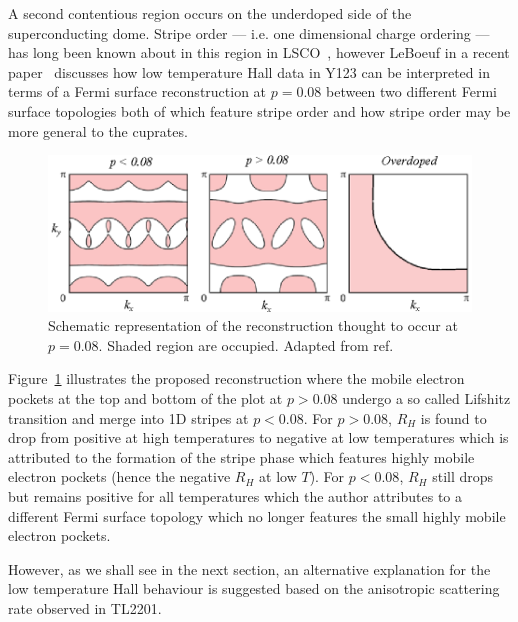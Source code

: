 A second contentious region occurs on the underdoped side of the superconducting dome. Stripe order --- i.e. one dimensional charge ordering --- has long been known about in this region in \ac{LSCO}~\cite{Kivelson2003}, however LeBoeuf \etal{} in a recent paper~\cite{LeBoeuf2011} discusses how low temperature Hall data in \ac{Y123} can be interpreted in terms of a Fermi surface reconstruction at $p=0.08$ between two different Fermi surface topologies both of which feature stripe order and how stripe order may be more general to the cuprates.
\begin{figure}[htbp]
    \begin{center}
        \includegraphics[scale=0.9]{Chapter-Introduction/Figures/LifshitzReconstruction/LifshitzReconstruction}
        \caption{Schematic representation of the reconstruction thought to occur at $p=0.08$. Shaded region are occupied. Adapted from ref.~\cite{Vojta2011}}
        \label{Fig:Intro:LifshitzReconstruction}
    \end{center}
\end{figure}
Figure~\ref{Fig:Intro:LifshitzReconstruction} illustrates the proposed reconstruction where the mobile electron pockets at the top and bottom of the plot at $p > 0.08$ undergo a so called Lifshitz transition and merge into 1D stripes at $p < 0.08$.  For $p > 0.08$, $R_H$ is found to drop from positive at high temperatures to negative at low temperatures which is attributed to the formation of the stripe phase which features highly mobile electron pockets (hence the negative $R_H$ at low $T$). For $p < 0.08$, $R_H$ still drops but remains positive for all temperatures which the author attributes to a different Fermi surface topology which no longer features the small highly mobile electron pockets. 

However, as we shall see in the next section, an alternative explanation for the low temperature Hall behaviour is suggested based on the anisotropic scattering rate observed in \ac{TL2201}. 





